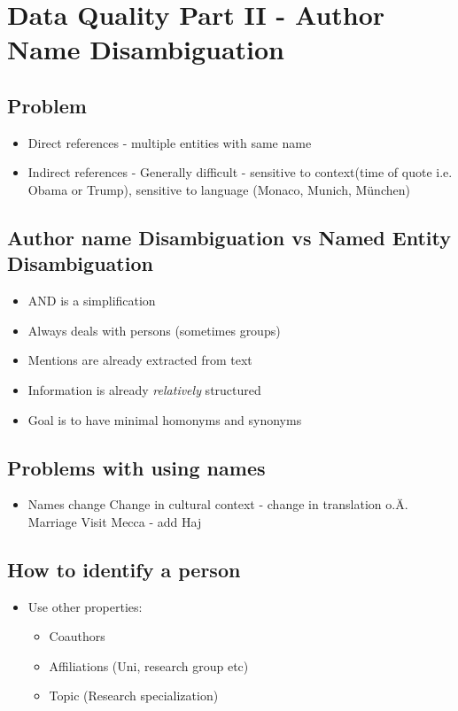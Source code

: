 \documentclass[10pt,a4paper]{scrreprt}
\begin{document}
\chapter{Data Quality Part II - Author Name Disambiguation}
\section{Problem}
\begin{itemize}
	\item Direct references - multiple entities with same name
	\item Indirect references - Generally difficult - sensitive to context(time of quote i.e. Obama or Trump), sensitive to language (Monaco, Munich, München)
\end{itemize}

\section{Author name Disambiguation vs Named Entity Disambiguation}
\begin{itemize}
	\item AND is a simplification
	\item Always deals with persons (sometimes groups)
	\item Mentions are already extracted from text
	\item Information is already \textit{relatively} structured
	\item Goal is to have minimal homonyms and synonyms 
\end{itemize}

\section{Problems with using names}
\begin{itemize}
	\item Names change
	\subitem Change in cultural context - change in translation o.Ä.
	\subitem Marriage
	\subitem Visit Mecca - add Haj
\end{itemize}

\section{How to identify a person}
\begin{itemize}
	\item Use other properties:
	\begin{itemize}
		\item Coauthors
		\item Affiliations (Uni, research group etc)
		\item Topic (Research specialization)
	\end{itemize}
\end{itemize}
\end{document}
